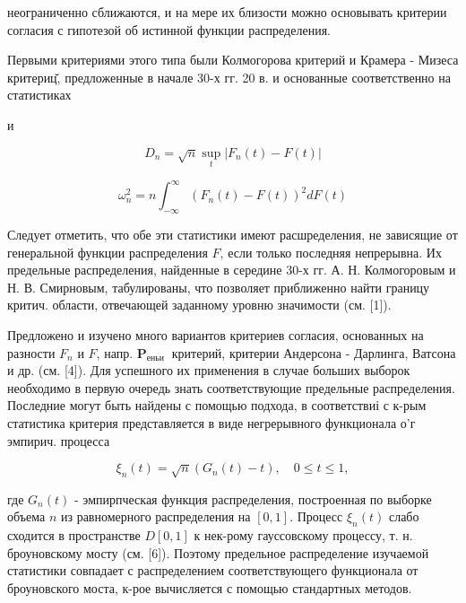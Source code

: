 \documentclass[10pt]{article}
\begin{document}
неограниченно сближаются, и на мере их близости можно основывать критерии согласия с гипотезой об истинной функции распределения.



Первыми критериями этого типа были Колмогорова критерий и Крамера - Мизеса критериц̆, предложенные в начале 30-х гг. 20 в. и основанные соответственно на статистиках



и



\[

D_{n}=\sqrt{n} \sup _{t}\left|F_{n}(t)-F(t)\right|

\]



\[

\omega_{n}^{2}=n \int_{-\infty}^{\infty}\left(F_{n}(t)-F(t)\right)^{2} d F(t)

\]



Следует отметить, что обе эти статистики имеют расшределения, не зависящие от генеральной функции распределения $F$, если только последняя непрерывна. Их предельные распределения, найденные в середине 30-х гг. А. Н. Колмогоровым и Н. В. Смирновым, табулированы, что позволяет приближенно найти границу критич. области, отвечающей заданному уровню значимости (см. [1]).



Предложено и изучено много вариантов критериев согласия, основанных на разности $F_{n}$ и $F$, напр. $\boldsymbol{P}_{\text {еньи }}$ критерий, критерии Андерсона - Дарлинга, Ватсона и др. (см. [4]). Для успешного их применения в случае больших выборок необходимо в первую очередь знать соответствующие предельные распределения. Последние могут быть найдены с помощью подхода, в соответствиі с к-рым статистика критерия представляется в виде негрерывного функционала о'г эмпирич. процесса



\[

\xi_{n}(t)=\sqrt{n}\left(G_{n}(t)-t\right), \quad 0 \leqslant t \leqslant 1,

\]



где $G_{n}(t)$ - эмпирпческая функция распределения, построенная по выборке объема $n$ из равномерного распределения на $[0,1]$. Процесс $\xi_{n}(t)$ слабо сходится в пространстве $D[0,1]$ к нек-рому гауссовскому процессу, т. н. броуновскому мосту (см. [6]). Поэтому предельное распределение изучаемой статистики совпадает с распределением соответствующего функционала от броуновского моста, к-рое вычисляется с помощью стандартных методов.
\end{document}
